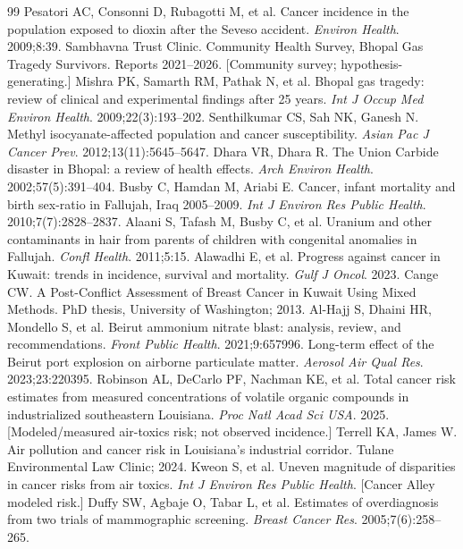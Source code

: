 \documentclass[3p,times]{elsarticle}
\begin{document}
\begin{thebibliography}{99}
 Pesatori AC, Consonni D, Rubagotti M, et al. Cancer incidence in the population exposed to dioxin after the Seveso accident. \textit{Environ Health}. 2009;8:39.
 Sambhavna Trust Clinic. Community Health Survey, Bhopal Gas Tragedy Survivors. Reports 2021--2026. [Community survey; hypothesis-generating.]
 Mishra PK, Samarth RM, Pathak N, et al. Bhopal gas tragedy: review of clinical and experimental findings after 25 years. \textit{Int J Occup Med Environ Health}. 2009;22(3):193--202.
 Senthilkumar CS, Sah NK, Ganesh N. Methyl isocyanate-affected population and cancer susceptibility. \textit{Asian Pac J Cancer Prev}. 2012;13(11):5645--5647.
 Dhara VR, Dhara R. The Union Carbide disaster in Bhopal: a review of health effects. \textit{Arch Environ Health}. 2002;57(5):391--404.
 Busby C, Hamdan M, Ariabi E. Cancer, infant mortality and birth sex-ratio in Fallujah, Iraq 2005--2009. \textit{Int J Environ Res Public Health}. 2010;7(7):2828--2837.
 Alaani S, Tafash M, Busby C, et al. Uranium and other contaminants in hair from parents of children with congenital anomalies in Fallujah. \textit{Confl Health}. 2011;5:15.
 Alawadhi E, et al. Progress against cancer in Kuwait: trends in incidence, survival and mortality. \textit{Gulf J Oncol}. 2023.
 Cange CW. A Post-Conflict Assessment of Breast Cancer in Kuwait Using Mixed Methods. PhD thesis, University of Washington; 2013.
 Al-Hajj S, Dhaini HR, Mondello S, et al. Beirut ammonium nitrate blast: analysis, review, and recommendations. \textit{Front Public Health}. 2021;9:657996.
 Long-term effect of the Beirut port explosion on airborne particulate matter. \textit{Aerosol Air Qual Res}. 2023;23:220395.
 Robinson AL, DeCarlo PF, Nachman KE, et al. Total cancer risk estimates from measured concentrations of volatile organic compounds in industrialized southeastern Louisiana. \textit{Proc Natl Acad Sci USA}. 2025. [Modeled/measured air-toxics risk; not observed incidence.]
 Terrell KA, James W. Air pollution and cancer risk in Louisiana's industrial corridor. Tulane Environmental Law Clinic; 2024.
 Kweon S, et al. Uneven magnitude of disparities in cancer risks from air toxics. \textit{Int J Environ Res Public Health}. [Cancer Alley modeled risk.]
 Duffy SW, Agbaje O, Tabar L, et al. Estimates of overdiagnosis from two trials of mammographic screening. \textit{Breast Cancer Res}. 2005;7(6):258--265.

\end{thebibliography}
\end{document}
